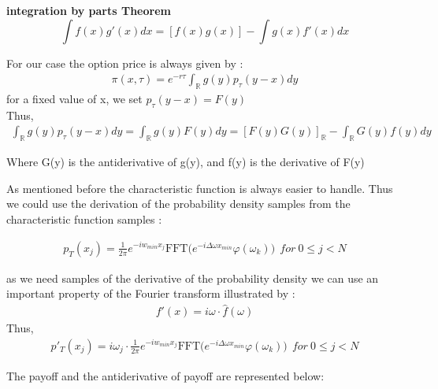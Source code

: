 \documentclass[12pt]{report}
\begin{document}
\textbf{ integration by parts Theorem }
\begin{equation*}
\int f(x) g'(x) dx =  [f(x) g(x)] - \int g(x) f'(x)  dx 
\end{equation*}

For our case the option price is always given by :
\begin{gather*}
\pi(x, \tau)=e^{-r\tau} \int_{\mathbb{R}}g(y)p_{\tau}(y-x)dy 
\end{gather*}
for a fixed value of x, we set $p_{\tau}(y-x)=F(y) $\\
Thus, 
\begin{gather*}
\int_{\mathbb{R}}g(y)p_{\tau}(y-x)dy =\int_{\mathbb{R}}g(y)F(y)dy=[F(y) G(y)]_{\mathbb{R}} - \int_{\mathbb{R}} G(y) f(y)  dy
\end{gather*}

Where G(y) is the antiderivative of g(y), and f(y) is the derivative of F(y)

As mentioned before the characteristic function is always easier to handle. Thus we could use the derivation of the probability density samples from the characteristic function samples :

\begin{gather}
p_T(x_j)=\frac{1}{2 \pi} e^{- iw_{min} x_j} \text{FFT}\big ( e^{-i \Delta\omega x_{min} } \varphi(\omega_k) \big) ~~for~ 0 \leqslant j < N
\end{gather}


as we need samples of the derivative of the probability density we can use an important property of the Fourier transform illustrated by :
\begin{gather*}
f'(x)= i \omega \cdot \hat{f}(\omega)
\end{gather*}
Thus, 
\begin{gather}
p'_T(x_j)= i \omega_j \cdot   \frac{1}{2 \pi} e^{- iw_{min} x_j} \text{FFT}\big ( e^{-i \Delta\omega x_{min} } \varphi(\omega_k) \big) ~~for~ 0 \leqslant j < N
\end{gather}

The payoff and the antiderivative of payoff are represented below:


 
\end{document}
